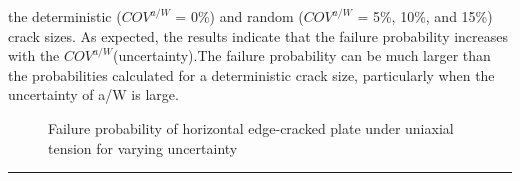 \documentclass[12pt]{article}
\begin{document}
the deterministic ($COV^{a/W}$ = 0\%) and random ($COV^{a/W}$ = 5\%, 10\%, and 15\%) crack sizes. As expected, the results indicate that the
failure probability increases with the $COV^{a/W}$(uncertainty).The failure probability can be much larger than the probabilities
calculated for a deterministic crack size, particularly when the uncertainty of a/W is large.
\begin{figure}[H]
    \centering
    \captionsetup{labelformat=empty}
    \caption{Failure probability of horizontal edge-cracked plate under uniaxial tension for varying uncertainty}  
\end{figure}


\rule{\textwidth}{.1em}
\end{document}
